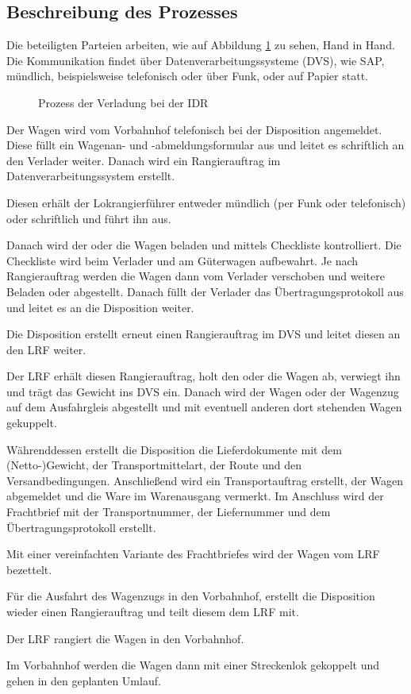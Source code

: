 \subsection{Beschreibung des Prozesses}
Die beteiligten Parteien arbeiten, wie auf Abbildung \ref{fig:IDR_Warenausgang} zu sehen, Hand in Hand. Die Kommunikation findet über Datenverarbeitungssysteme (\acrshort{DVS}), wie SAP, mündlich, beispielsweise telefonisch oder über Funk, oder auf Papier statt.\par
\begin{figure}
    \centering
    
    \caption{Prozess der Verladung bei der IDR}
    \label{fig:IDR_Warenausgang}
\end{figure}
Der Wagen wird vom Vorbahnhof telefonisch bei der Disposition angemeldet. Diese füllt ein Wagenan- und -abmeldungsformular aus und leitet es schriftlich an den Verlader weiter. Danach wird ein Rangierauftrag im Datenverarbeitungssystem erstellt.\par
Diesen erhält der Lokrangierführer entweder mündlich (per Funk oder telefonisch) oder schriftlich und führt ihn aus.\par
Danach wird der oder die Wagen beladen und mittels Checkliste kontrolliert. Die Checkliste wird beim Verlader und am Güterwagen aufbewahrt. Je nach Rangierauftrag werden die Wagen dann vom Verlader verschoben und weitere Beladen oder abgestellt. Danach füllt der Verlader das Übertragungsprotokoll aus und leitet es an die Disposition weiter.\par
Die Disposition erstellt erneut einen Rangierauftrag im DVS und leitet diesen an den \acrshort{LRF} weiter.\par
Der \acrshort{LRF} erhält diesen Rangierauftrag, holt den oder die Wagen ab, verwiegt ihn und trägt das Gewicht ins DVS ein. Danach wird der Wagen oder der Wagenzug auf dem Ausfahrgleis abgestellt und mit eventuell anderen dort stehenden Wagen gekuppelt.\par
Währenddessen erstellt die Disposition die Lieferdokumente mit dem (Netto-)Gewicht, der Transportmittelart, der Route und den Versandbedingungen. Anschließend wird ein Transportauftrag erstellt, der Wagen abgemeldet und die Ware im Warenausgang vermerkt. Im Anschluss wird der Frachtbrief mit der Transportnummer, der Liefernummer und dem Übertragungsprotokoll erstellt.\par
Mit einer vereinfachten Variante des Frachtbriefes wird der Wagen vom \acrshort{LRF} bezettelt.\par
Für die Ausfahrt des Wagenzugs in den Vorbahnhof, erstellt die Disposition wieder einen Rangierauftrag und teilt diesem dem \acrshort{LRF} mit.\par
Der \acrshort{LRF} rangiert die Wagen in den Vorbahnhof.\par
Im Vorbahnhof werden die Wagen dann mit einer Streckenlok gekoppelt und gehen in den geplanten Umlauf.

